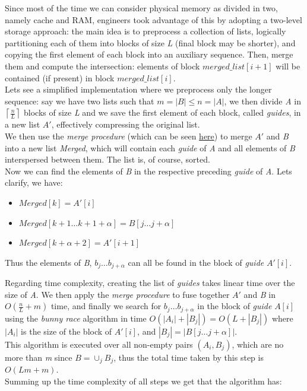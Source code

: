 Since most of the time we can consider physical memory as divided in two, namely cache and RAM, engineers took advantage of this by adopting a two-level storage approach: the main idea is to preprocess a collection of lists, logically partitioning each of them into blocks of size \textit{L} (final block may be shorter), and copying the first element of each block into an auxiliary sequence. Then, merge them and compute the intersection: elements of block $merged\_list[i+1]$ will be contained (if present) in block $merged\_list[i]$.\\
Lets see a simplified implementation where we preprocess only the longer sequence: say we have two lists such that $m=|B| \leq n=|A|$, we then divide \textit{A} in $\left\lceil \frac{n}{L} \right\rceil$ blocks of size \textit{L} and we save the first element of each block, called \textit{guides}, in a new list $A'$, effectively compressing the original list. \\
We then use the \textit{merge procedure} (which can be seen \href{https://en.wikipedia.org/wiki/Merge_algorithm}{here}) to merge $A'$ and \textit{B} into a new list \textit{Merged}, which will contain each \textit{guide} of \textit{A} and all elements of \textit{B} interspersed between them. The list is, of course, sorted.\\
Now we can find the elements of \textit{B} in the respective preceding \textit{guide} of \textit{A}. Lets clarify, we have:

\begin{itemize}
    \item $Merged[k] = A'[i]$
    \item $Merged[k+1 \ldots k+1+\alpha] = B[j \ldots j+\alpha]$
    \item $Merged[k+\alpha +2] = A'[i+1]$
\end{itemize}

Thus the elements of \textit{B}, $b_j \ldots b_{j+\alpha}$ can all be found in the block of \textit{guide} $A'[i]$.

Regarding time complexity, creating the list of \textit{guides} takes linear time over the size of \textit{A}. We then apply the \textit{merge procedure} to fuse together $A'$ and \textit{B} in $O\left(\frac{n}{L} +m \right)$ time, and finally we search for $b_j \ldots b_{j+\alpha}$ in the block of \textit{guide} $A[i]$ using the \textit{bunny race}  algorithm in time $O\left(|A_i| + |B_j|\right) = O\left(L+|B_j|\right)$ where $|A_i|$ is the size of the block of $A'[i]$, and $|B_j| = \big|B[j \ldots j+\alpha]\big|$.\\
This algorithm is executed over all non-empty pairs $(A_i, B_j)$, which are no more than \textit{m} since $B = \cup_j B_j$, thus the total time taken by this step is $O(Lm+m)$.\\
Summing up the time complexity of all steps we get that the algorithm has:

